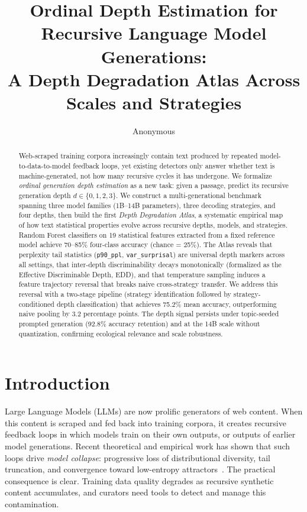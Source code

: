 \documentclass[11pt,a4paper]{article}
\title{Ordinal Depth Estimation for Recursive Language Model Generations:\\A Depth Degradation Atlas Across Scales and Strategies}
\author{Anonymous}
\date{}
\newcommand{\edd}{\textsc{EDD}}
\begin{document}
\maketitle

\begin{abstract}
Web-scraped training corpora increasingly contain text produced by repeated model-to-data-to-model feedback loops, yet existing detectors only answer whether text is machine-generated, not how many recursive cycles it has undergone. We formalize \emph{ordinal generation depth estimation} as a new task: given a passage, predict its recursive generation depth $d \in \{0,1,2,3\}$. We construct a multi-generational benchmark spanning three model families (1B--14B parameters), three decoding strategies, and four depths, then build the first \emph{Depth Degradation Atlas}, a systematic empirical map of how text statistical properties evolve across recursive depths, models, and strategies. Random Forest classifiers on 19 statistical features extracted from a fixed reference model achieve 70--85\% four-class accuracy (chance = 25\%). The Atlas reveals that perplexity tail statistics (\texttt{p90\_ppl}, \texttt{var\_surprisal}) are universal depth markers across all settings, that inter-depth discriminability decays monotonically (formalized as the Effective Discriminable Depth, \edd), and that temperature sampling induces a feature trajectory reversal that breaks naive cross-strategy transfer. We address this reversal with a two-stage pipeline (strategy identification followed by strategy-conditioned depth classification) that achieves 75.2\% mean accuracy, outperforming naive pooling by 3.2 percentage points. The depth signal persists under topic-seeded prompted generation (92.8\% accuracy retention) and at the 14B scale without quantization, confirming ecological relevance and scale robustness.
\end{abstract}

\section{Introduction}

Large Language Models (LLMs) are now prolific generators of web content. When this content is scraped and fed back into training corpora, it creates recursive feedback loops in which models train on their own outputs, or outputs of earlier model generations. Recent theoretical and empirical work has shown that such loops drive \emph{model collapse}: progressive loss of distributional diversity, tail truncation, and convergence toward low-entropy attractors~\citep{shumailov2024ai,alemohammad2024selfconsuming,dohmatob2024tale,gerstgrasser2024model}. The practical consequence is clear. Training data quality degrades as recursive synthetic content accumulates, and curators need tools to detect and manage this contamination.
\end{document}
